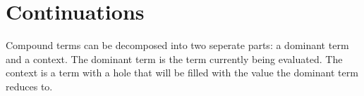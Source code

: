 %
%
%

\section{Continuations}
  
  Compound terms can be decomposed into two seperate parts: a dominant 
  term and a context. The dominant term is the term currently being 
  evaluated. The context is a term with a hole that will be filled with 
  the value the dominant term reduces to.
  
